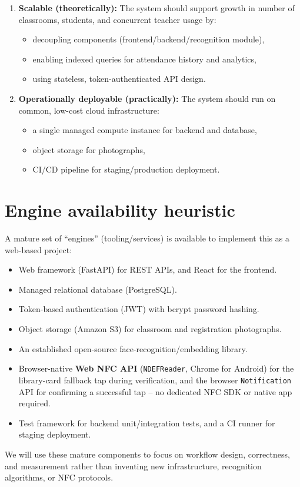 \documentclass[11pt,a4paper]{article}
\begin{document}
\begin{enumerate}[leftmargin=0.7cm]
    \item \textbf{Scalable (theoretically):} The system should support growth in number of classrooms, students, and concurrent teacher usage by:
    \begin{itemize}[leftmargin=0.7cm]
        \item decoupling components (frontend/backend/recognition module),
        \item enabling indexed queries for attendance history and analytics,
        \item using stateless, token-authenticated API design.
    \end{itemize}
    
    \item \textbf{Operationally deployable (practically):} The system should run on common, low-cost cloud infrastructure:
    \begin{itemize}[leftmargin=0.7cm]
        \item a single managed compute instance for backend and database,
        \item object storage for photographs,
        \item CI/CD pipeline for staging/production deployment.
    \end{itemize}
\end{enumerate}

\section{Engine availability heuristic}
A mature set of ``engines'' (tooling/services) is available to
implement this as a web-based project:
\begin{itemize}[leftmargin=0.7cm]
    \item Web framework (FastAPI) for REST APIs, and React for the frontend.
    \item Managed relational database (PostgreSQL).
    \item Token-based authentication (JWT) with bcrypt password hashing.
    \item Object storage (Amazon S3) for classroom and registration photographs.
    \item An established open-source face-recognition/embedding library.
    \item Browser-native \textbf{Web NFC API} (\texttt{NDEFReader}, Chrome for Android) for the library-card fallback tap during verification, and the browser \texttt{Notification} API for confirming a successful tap -- no dedicated NFC SDK or native app required.
    \item Test framework for backend unit/integration tests, and a CI runner for staging deployment.
\end{itemize}
We will use these mature components to focus on workflow design,
correctness, and measurement rather than inventing new
infrastructure, recognition algorithms, or NFC protocols.
\end{document}
